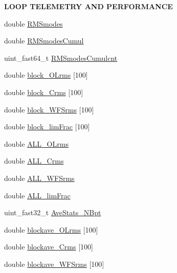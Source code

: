\begin{Indent}{\bf L\+O\+O\+P T\+E\+L\+E\+M\+E\+T\+R\+Y A\+N\+D P\+E\+R\+F\+O\+R\+M\+A\+N\+C\+E}\par
\begin{DoxyCompactItemize}
\item 
double \hyperlink{structAOLOOPCONTROL__CONF_ad57090b2c42760337dcf977cd0c18a18}{R\+M\+Smodes}
\item 
double \hyperlink{structAOLOOPCONTROL__CONF_a418390c0a9b27dfb88bf290d420b8466}{R\+M\+Smodes\+Cumul}
\item 
uint\+\_\+fast64\+\_\+t \hyperlink{structAOLOOPCONTROL__CONF_a8d7b25eb4b3e3cf196a1692cda26da84}{R\+M\+Smodes\+Cumulcnt}
\item 
double \hyperlink{structAOLOOPCONTROL__CONF_a974884f100a2db2545e5605d89e9c28d}{block\+\_\+\+O\+Lrms} \mbox{[}100\mbox{]}
\item 
double \hyperlink{structAOLOOPCONTROL__CONF_a20084d8553f57920ab9efb77a6c3fc2a}{block\+\_\+\+Crms} \mbox{[}100\mbox{]}
\item 
double \hyperlink{structAOLOOPCONTROL__CONF_ad2b6e1747337c652aa5e0b7391b76b15}{block\+\_\+\+W\+F\+Srms} \mbox{[}100\mbox{]}
\item 
double \hyperlink{structAOLOOPCONTROL__CONF_aacc6dbf0c8712ca3b23fa0e0ab527a39}{block\+\_\+lim\+Frac} \mbox{[}100\mbox{]}
\item 
double \hyperlink{structAOLOOPCONTROL__CONF_a7538b65f92ea609a4edd743278aeb529}{A\+L\+L\+\_\+\+O\+Lrms}
\item 
double \hyperlink{structAOLOOPCONTROL__CONF_a13b45be472f1a1932d5f6db026133909}{A\+L\+L\+\_\+\+Crms}
\item 
double \hyperlink{structAOLOOPCONTROL__CONF_a33355e57c989ae5660066996a1c37298}{A\+L\+L\+\_\+\+W\+F\+Srms}
\item 
double \hyperlink{structAOLOOPCONTROL__CONF_aa8ad46adbcb53cdfe3eeb48b4d73584a}{A\+L\+L\+\_\+lim\+Frac}
\item 
uint\+\_\+fast32\+\_\+t \hyperlink{structAOLOOPCONTROL__CONF_ac51012bfb779f376a4e4476f5a1c76dd}{Ave\+Stats\+\_\+\+N\+Bpt}
\item 
double \hyperlink{structAOLOOPCONTROL__CONF_a3abf091b21f9d919d6e8a7f6c474ed66}{blockave\+\_\+\+O\+Lrms} \mbox{[}100\mbox{]}
\item 
double \hyperlink{structAOLOOPCONTROL__CONF_abd87269aba4726303a46db462202520d}{blockave\+\_\+\+Crms} \mbox{[}100\mbox{]}
\item 
double \hyperlink{structAOLOOPCONTROL__CONF_a8559879588d5cb0baf2b918391f439c2}{blockave\+\_\+\+W\+F\+Srms} \mbox{[}100\mbox{]}

\end{DoxyCompactItemize}
\end{Indent}
